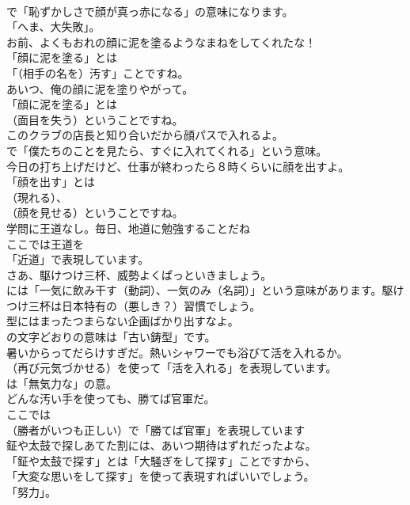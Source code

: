 \documentclass[8pt]{extreport}
\begin{document}
\begin{CJK}{UTF8}{min}
\\	で「恥ずかしさで顔が真っ赤になる」の意味になります。
\\	「へま、大失敗」。	
\\	お前、よくもおれの顔に泥を塗るようなまねをしてくれたな！ 
\\	「顔に泥を塗る」とは
\\	「（相手の名を）汚す」ことですね。	
\\	あいつ、俺の顔に泥を塗りやがって。 
\\	「顔に泥を塗る」とは
\\	（面目を失う）ということですね。	
\\	このクラブの店長と知り合いだから顔パスで入れるよ。 
\\	で「僕たちのことを見たら、すぐに入れてくれる」という意味。	
\\	今日の打ち上げだけど、仕事が終わったら８時くらいに顔を出すよ。 
\\	「顔を出す」とは
\\	（現れる）、
\\	（顔を見せる）ということですね。	
\\	学問に王道なし。毎日、地道に勉強することだね 
\\	ここでは王道を
\\	「近道」で表現しています。	
\\	さあ、駆けつけ三杯、威勢よくぱっといきましょう。 
\\	には「一気に飲み干す（動詞）、一気のみ（名詞）」という意味があります。駆けつけ三杯は日本特有の（悪しき？）習慣でしょう。	
\\	型にはまったつまらない企画ばかり出すなよ。 
\\	の文字どおりの意味は「古い鋳型」です。	
\\	暑いからってだらけすぎだ。熱いシャワーでも浴びて活を入れるか。 
\\	（再び元気づかせる）を使って「活を入れる」を表現しています。
\\	は「無気力な」の意。	
\\	どんな汚い手を使っても、勝てば官軍だ。 
\\	ここでは 
\\	（勝者がいつも正しい）で「勝てば官軍」を表現しています	
\\	鉦や太鼓で探しあてた割には、あいつ期待はずれだったよな。 
\\	「鉦や太鼓で探す」とは「大騒ぎをして探す」ことですから、
\\	「大変な思いをして探す」を使って表現すればいいでしょう。
\\	「努力」。	

\end{CJK}
\end{document}
